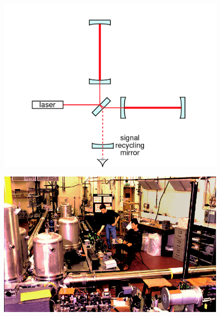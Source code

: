 \begin{figure}[]
\begin{center}
\includegraphics[width=1\columnwidth]{./figures/fig6b/fig6b}
\caption{ \protect}
\end{center}
\end{figure}



\begin{figure}[]
\begin{center}
\includegraphics[width=1\columnwidth]{./figures/figpro/figpro}
\caption{ \protect}
\end{center}
\end{figure}


